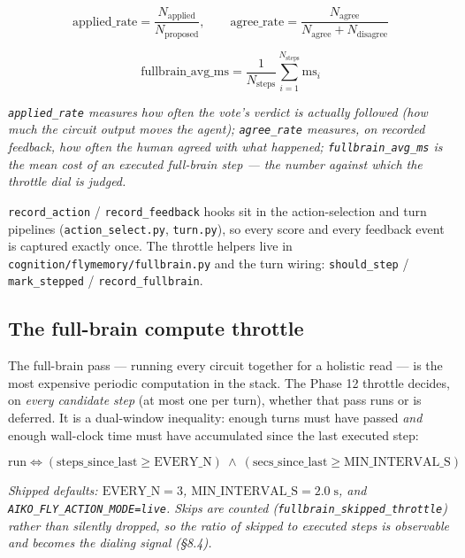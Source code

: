 \documentclass[11pt]{article}
\begin{document}
\begin{equation}
\mathrm{applied\_rate} = \frac{N_{\mathrm{applied}}}{N_{\mathrm{proposed}}},\qquad \mathrm{agree\_rate} = \frac{N_{\mathrm{agree}}}{N_{\mathrm{agree}} + N_{\mathrm{disagree}}}
\tag{12}
\end{equation}

\begin{equation}
\mathrm{fullbrain\_avg\_ms} = \frac{1}{N_{\mathrm{steps}}} \sum_{i=1}^{N_{\mathrm{steps}}} \mathrm{ms}_i
\tag{13}
\end{equation}

\noindent\emph{\texttt{applied\_rate} measures how often the vote's verdict is actually followed (how much the circuit output \emph{moves the agent}); \texttt{agree\_rate} measures, on recorded feedback, how often the human agreed with what happened; \texttt{fullbrain\_avg\_ms} is the mean cost of an executed full-brain step — the number against which the throttle dial is judged.}

\texttt{record\_action} / \texttt{record\_feedback} hooks sit in the action-selection and turn pipelines (\texttt{action\_select.py}, \texttt{turn.py}), so every score and every feedback event is captured exactly once. The throttle helpers live in \texttt{cognition/flymemory/fullbrain.py} and the turn wiring: \texttt{should\_step} / \texttt{mark\_stepped} / \texttt{record\_fullbrain}.

\subsection{The full-brain compute throttle}

The full-brain pass — running every circuit together for a holistic read — is the most expensive periodic computation in the stack. The Phase 12 throttle decides, on \emph{every candidate step} (at most one per turn), whether that pass runs or is deferred. It is a dual-window inequality: enough turns must have passed \emph{and} enough wall-clock time must have accumulated since the last executed step:

\begin{equation}
\text{run} \iff (\mathrm{steps\_since\_last} \ge \mathrm{EVERY\_N})\ \land\ (\mathrm{secs\_since\_last} \ge \mathrm{MIN\_INTERVAL\_S})
\tag{11}
\end{equation}

\noindent\emph{Shipped defaults: \(\mathrm{EVERY\_N} = 3\), \(\mathrm{MIN\_INTERVAL\_S} = 2.0\;\mathrm{s}\), and \texttt{AIKO\_FLY\_ACTION\_MODE=live}. Skips are counted (\texttt{fullbrain\_skipped\_throttle}) rather than silently dropped, so the ratio of skipped to executed steps is observable and becomes the dialing signal (§8.4).}
\end{document}
